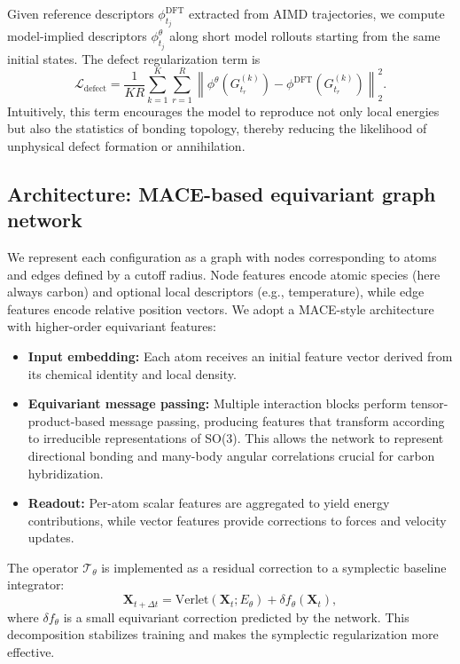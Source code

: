 \documentclass{article}
\begin{document}
Given reference descriptors $\phi^\text{DFT}_{t_j}$ extracted from AIMD trajectories, we compute model-implied descriptors $\phi^\theta_{t_j}$ along short model rollouts starting from the same initial states. The defect regularization term is
\begin{equation}
    \mathcal{L}_\text{defect} = \frac{1}{K R} \sum_{k=1}^K \sum_{r=1}^R \left\| \phi^\theta(G^{(k)}_{t_r}) - \phi^\text{DFT}(G^{(k)}_{t_r}) \right\|_2^2.
\end{equation}
Intuitively, this term encourages the model to reproduce not only local energies but also the statistics of bonding topology, thereby reducing the likelihood of unphysical defect formation or annihilation.

\subsection{Architecture: MACE-based equivariant graph network}

We represent each configuration as a graph with nodes corresponding to atoms and edges defined by a cutoff radius. Node features encode atomic species (here always carbon) and optional local descriptors (e.g., temperature), while edge features encode relative position vectors. We adopt a MACE-style architecture with higher-order equivariant features:
\begin{itemize}
    \item \textbf{Input embedding:} Each atom receives an initial feature vector derived from its chemical identity and local density.
    \item \textbf{Equivariant message passing:} Multiple interaction blocks perform tensor-product-based message passing, producing features that transform according to irreducible representations of SO(3). This allows the network to represent directional bonding and many-body angular correlations crucial for carbon hybridization.
    \item \textbf{Readout:} Per-atom scalar features are aggregated to yield energy contributions, while vector features provide corrections to forces and velocity updates.
\end{itemize}

The operator $\mathcal{T}_\theta$ is implemented as a residual correction to a symplectic baseline integrator:
\begin{equation}
    \mathbf{X}_{t+\Delta t} = \text{Verlet}(\mathbf{X}_t; E_\theta) + \delta f_\theta(\mathbf{X}_t),
\end{equation}
where $\delta f_\theta$ is a small equivariant correction predicted by the network. This decomposition stabilizes training and makes the symplectic regularization more effective.
\end{document}
